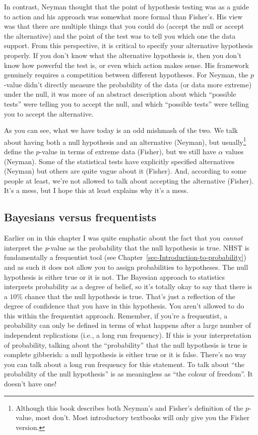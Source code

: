 \documentclass[
  a4paper,
]{book}
\begin{document}
In contrast, Neyman thought that the point of hypothesis testing was as
a guide to action and his approach was somewhat more formal than
Fisher's. His view was that there are multiple things that you could do
(accept the null or accept the alternative) and the point of the test
was to tell you which one the data support. From this perspective, it is
critical to specify your alternative hypothesis properly. If you don't
know what the alternative hypothesis is, then you don't know how
powerful the test is, or even which action makes sense. His framework
genuinely requires a competition between different hypotheses. For
Neyman, the \(p\)-value didn't directly measure the probability of the
data (or data more extreme) under the null, it was more of an abstract
description about which ``possible tests'' were telling you to accept
the null, and which ``possible tests'' were telling you to accept the
alternative.

As you can see, what we have today is an odd mishmash of the two. We
talk about having both a null hypothesis and an alternative (Neyman),
but usually\footnote{Although this book describes both Neyman's and
  Fisher's definition of the \(p\)-value, most don't. Most introductory
  textbooks will only give you the Fisher version.} define the
\(p\)-value in terms of extreme data (Fisher), but we still have
\(\alpha\) values (Neyman). Some of the statistical tests have
explicitly specified alternatives (Neyman) but others are quite vague
about it (Fisher). And, according to some people at least, we're not
allowed to talk about accepting the alternative (Fisher). It's a mess,
but I hope this at least explains why it's a mess.

\hypertarget{bayesians-versus-frequentists}{%
\subsection{Bayesians versus
frequentists}\label{bayesians-versus-frequentists}}

Earlier on in this chapter I was quite emphatic about the fact that you
\emph{cannot} interpret the \emph{p}-value as the probability that the
null hypothesis is true. NHST is fundamentally a frequentist tool (see
Chapter~\ref{sec-Introduction-to-probability}) and as such it does not
allow you to assign probabilities to hypotheses. The null hypothesis is
either true or it is not. The Bayesian approach to statistics interprets
probability as a degree of belief, so it's totally okay to say that
there is a \(10\%\) chance that the null hypothesis is true. That's just
a reflection of the degree of confidence that you have in this
hypothesis. You aren't allowed to do this within the frequentist
approach. Remember, if you're a frequentist, a probability can only be
defined in terms of what happens after a large number of independent
replications (i.e., a long run frequency). If this is your
interpretation of probability, talking about the ``probability'' that
the null hypothesis is true is complete gibberish: a null hypothesis is
either true or it is false. There's no way you can talk about a long run
frequency for this statement. To talk about ``the probability of the
null hypothesis'' is as meaningless as ``the colour of freedom''. It
doesn't have one!
\end{document}
